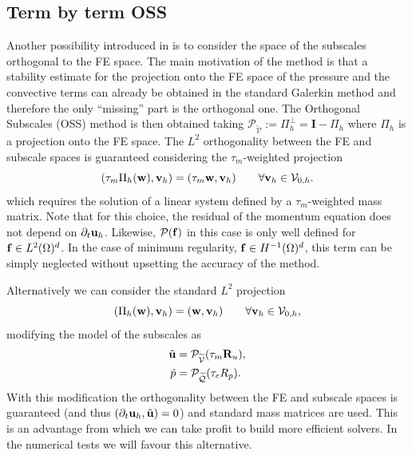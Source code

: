 \subsection{Term by term OSS}
\label{subsec-C5_OSStbt}
Another possibility introduced in \cite{codina_stabilization_2000} is to consider the space of the subscales orthogonal to the FE space. The main motivation of the method is that a stability estimate for the projection onto the FE space of the pressure and the convective terms can already be obtained in the standard Galerkin method and therefore the only ``missing'' part is the orthogonal one. The Orthogonal Subscales (OSS) method is then obtained taking $\mathcal{P}_{\widetilde{\mathcal{V}}}:=\Pi_h^\bot=\mathbf{I}-\Pi_h$ where $\Pi_h$ is a projection onto the FE space. The $L^2$ orthogonality between the FE and subscale spaces is guaranteed considering the $\tau_m$-weighted projection
\begin{equation}
\label{eq-C5_Pi_h_tau}
(\tau_m\Pi_h({\bf w}),{\bf v}_h)=(\tau_m{\bf w},{\bf v}_h) \quad \quad \forall{\bf v}_h\in\mathcal{V}_{0,h}.
\end{equation}
which requires the solution of a linear system defined by a $\tau_m$-weighted mass matrix.
Note that for this choice, the residual of the momentum equation does not depend on $\partial_t{\bf u}_h$. Likewise, $\mathcal{P}({\bf f})$ in this case is only well defined for ${\bf f}\in L^2(\Omega)^d$. In the case of minimum regularity, ${\bf f}\in H^{-1}(\Omega)^d$, this term can be simply neglected without upsetting the accuracy of the method. 

\begin{remark}
Alternatively we can consider the standard $L^2$ projection
\begin{equation}
\label{eq-C5_Pi_h}
(\Pi_h({\bf w}),{\bf v}_h)=({\bf w},{\bf v}_h) \quad \quad \forall{\bf v}_h\in\mathcal{V}_{0,h},
\end{equation}
modifying the model of the subscales as 
\begin{align}
\tilde{{\bf u}}&=\mathcal{P}_{\widetilde{\mathcal{V}}}(\tau_m {\bf R}_u),\\
\tilde{p}&=\mathcal{P}_{\widetilde{\mathcal{Q}}}(\tau_c R_p).
\end{align}
With this modification the orthogonality between the FE and subscale spaces is guaranteed (and thus $(\partial_t{\bf u}_h,\tilde{{\bf u}})=0$) and standard mass matrices are used. This is an advantage from which we can take profit to build more efficient solvers. In the numerical tests we will favour this alternative.
\end{remark}

